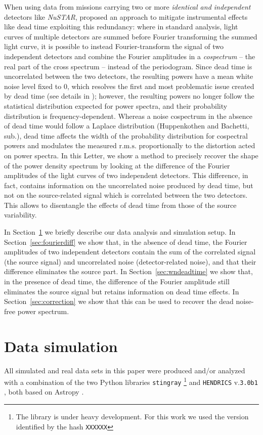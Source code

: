 \documentclass[twocolumn]{aastex61}
\newcommand{\project}[1]{\textsl{#1}}
\newcommand{\nustar}{\project{NuSTAR}\xspace}
\newcommand{\sref}{Section~\ref}
\newcommand{\rms}{\ensuremath{\mathrm{r.m.s.}}\xspace}
\begin{document}
When using data from missions carrying two or more \textit{identical and independent} detectors like \nustar, \citet{Bachetti+15} proposed an approach to mitigate instrumental effects like dead time exploiting this redundancy: 
where in standard analysis, light curves of multiple detectors are summed before Fourier transforming the summed light curve, 
it is possible to instead Fourier-transform the signal of two independent detectors and combine the Fourier amplitudes in a \textit{cospectrum} -- the real part of the cross spectrum -- instead of the periodogram. 
Since dead time is uncorrelated between the two detectors, the resulting powers have a mean white noise level fixed to 0, which resolves the first and most problematic issue created by dead time (see details in \citealt{Bachetti+15}); however, the resulting powers no longer follow the statistical distribution expected for power spectra, and their probability distribution is frequency-dependent.
Whereas a noise cospectrum in the absence of dead time would follow a Laplace distribution (Huppenkothen and Bachetti, sub.),
dead time affects the width of the probability distribution for cospectral powers and modulates the measured \rms proportionally to the distortion acted on power spectra.
In this Letter, we show a method to precisely recover the shape of the power density spectrum by looking at the difference of the Fourier amplitudes of the light curves of two independent detectors.
This difference, in fact, contains information on the uncorrelated noise produced by dead time, but not on the source-related  signal which is correlated between the two detectors.
This allows to disentangle the effects of dead time from those of the source variability.

In \sref{sec:data} we briefly describe our data analysis and simulation setup.
In \sref{sec:fourierdiff} we show that, in the absence of dead time, the Fourier amplitudes of two independent detectors contain the sum of the correlated signal (the source signal) and uncorrelated noise (detector-related noise), and that their difference eliminates the source part. 
In \sref{sec:wndeadtime} we show that, in the presence of dead time, the difference of the Fourier amplitude still eliminates the source signal but retains information on dead time effects.
In \sref{sec:correction} we show that this can be used to recover the dead noise-free power spectrum.


\section{Data simulation} \label{sec:data}
All simulated and real data sets in this paper were produced and/or analyzed with a combination of the two Python libraries \texttt{stingray}%
\footnote{The library is under heavy development.
    For this work we used the version identified by the hash \texttt{XXXXXX}}
\citep{huppenkothen2016} and \texttt{HENDRICS} v.\texttt{3.0b1} \citep[formerly known as MaLTPyNT;][]{2015ascl.soft02021B}, both based on Astropy \citep{astropy2013}.
\end{document}
